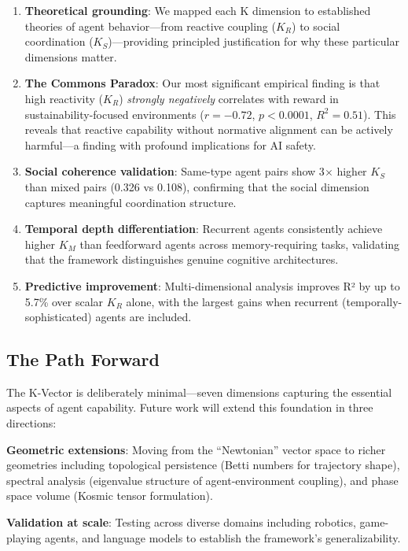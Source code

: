 \documentclass[11pt,a4paper]{article}
\newcommand{\kr}{K_R}
\newcommand{\km}{K_M}
\newcommand{\ks}{K_S}
\begin{document}
\begin{enumerate}
    \item \textbf{Theoretical grounding}: We mapped each K dimension to established theories of agent behavior---from reactive coupling ($\kr$) to social coordination ($\ks$)---providing principled justification for why these particular dimensions matter.

    \item \textbf{The Commons Paradox}: Our most significant empirical finding is that high reactivity ($\kr$) \emph{strongly negatively} correlates with reward in sustainability-focused environments ($r = -0.72$, $p < 0.0001$, $R^2 = 0.51$). This reveals that reactive capability without normative alignment can be actively harmful---a finding with profound implications for AI safety.

    \item \textbf{Social coherence validation}: Same-type agent pairs show 3$\times$ higher $\ks$ than mixed pairs (0.326 vs 0.108), confirming that the social dimension captures meaningful coordination structure.

    \item \textbf{Temporal depth differentiation}: Recurrent agents consistently achieve higher $\km$ than feedforward agents across memory-requiring tasks, validating that the framework distinguishes genuine cognitive architectures.

    \item \textbf{Predictive improvement}: Multi-dimensional analysis improves R² by up to 5.7\% over scalar $\kr$ alone, with the largest gains when recurrent (temporally-sophisticated) agents are included.
\end{enumerate}

\subsection{The Path Forward}

The K-Vector is deliberately minimal---seven dimensions capturing the essential aspects of agent capability. Future work will extend this foundation in three directions:

\textbf{Geometric extensions}: Moving from the ``Newtonian'' vector space to richer geometries including topological persistence (Betti numbers for trajectory shape), spectral analysis (eigenvalue structure of agent-environment coupling), and phase space volume (Kosmic tensor formulation).

\textbf{Validation at scale}: Testing across diverse domains including robotics, game-playing agents, and language models to establish the framework's generalizability.
\end{document}
